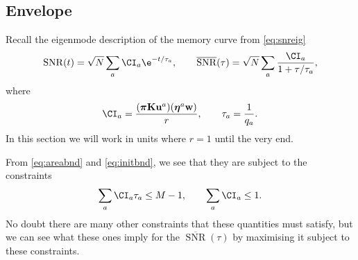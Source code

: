 \documentclass[12pt]{article}
\newcommand{\eqm}{\pi}
\newcommand{\eq}{\boldsymbol{\eqm}}
\newcommand{\wm}{w}
\newcommand{\w}{\mathbf{\wm}}
\newcommand{\encm}{K}
\newcommand{\enc}{\mathbf{\encm}}
\newcommand{\evrm}{u}
\newcommand{\evr}{\mathbf{\evrm}}
\newcommand{\evlm}{\eta}
\newcommand{\evl}{\boldsymbol{\evlm}}
\DeclareMathOperator{\snr}{SNR}
\newcommand{\snrb}{\overline{\snr}}
\begin{document}

\subsection{Envelope}\label{sec:envelope}

Recall the eigenmode description of the memory curve from \cref{eq:snreig}
%
\begin{equation*}
  \snr(t) = \sqrt{N} \sum_a \CI_a \e^{-t/\tau_a},
  \qquad
  \snrb(\tau) = \sqrt{N} \sum_a \frac{\CI_a}{1+\tau/\tau_a},
\end{equation*}
%
where
%
\begin{equation*}
  \CI_a = \frac{(\eq \enc \evr^a) (\evl^a \w)}{r},
  \qquad
  \tau_a = \frac{1}{q_a}.
\end{equation*}
%
In this section we will work in units where \(r = 1\) until the very end.

From \eqref{eq:areabnd} and \eqref{eq:initbnd}, we see that they are subject to the constraints
%
\begin{equation}\label{eq:coeffconstr}
  \sum_a \CI_a \tau_a \leq M-1,
  \qquad
  \sum_a \CI_a \leq 1.
\end{equation}
%
No doubt there are many other constraints that these quantities must satisfy, but we can see what these ones imply for the \(\snrb(\tau)\) by maximising it subject to these constraints.
\end{document}
